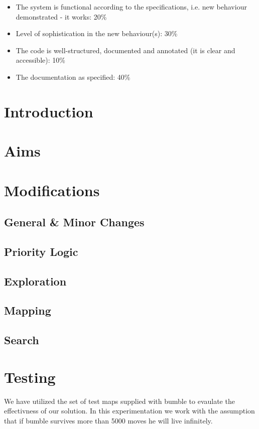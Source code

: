 \documentclass[a4paper,oneside]{report}
\begin{document}
\begin{itemize}
\item The system is functional according to the specifications, i.e. new behaviour demonstrated - it works: 20\%
\item Level of sophistication in the new behaviour(s): 30\%
\item The code is well-structured, documented and annotated (it is clear and accessible): 10\%
\item The documentation as specified: 40\%
\end{itemize}





\section{Introduction}

\section{Aims}

\section{Modifications}


	\subsection{General \& Minor Changes}

	\subsection{Priority Logic}
	
	\subsection{Exploration}

	\subsection{Mapping}


	\subsection{Search}
	

\section{Testing}
	We have utilized the set of test maps supplied with bumble to evaulate the effectivness of our solution. In this experimentation we work with the assumption that if bumble survives more than 5000 moves he will live infinitely.
	
\end{document}
